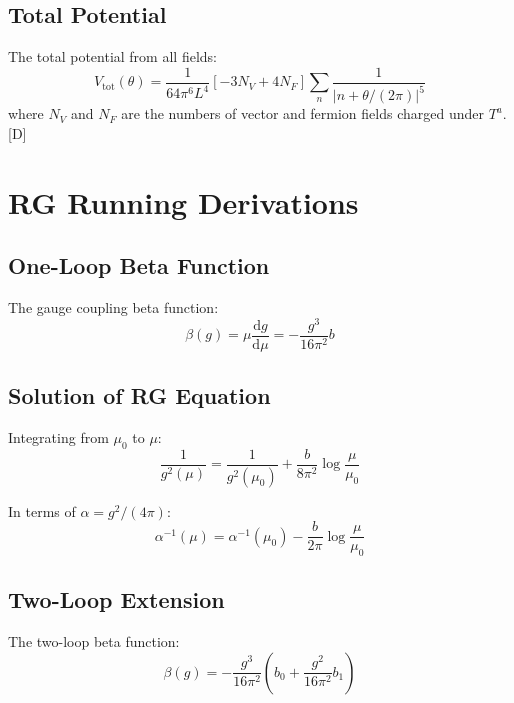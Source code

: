 \documentclass[11pt,a4paper]{article}
\newcommand{\dd}{\mathrm{d}}
\begin{document}
\subsection{Total Potential}

The total potential from all fields:
\begin{equation}
V_{\text{tot}}(\theta) = \frac{1}{64\pi^6 L^4}\left[-3 N_V + 4 N_F\right]\sum_n \frac{1}{|n + \theta/(2\pi)|^5}
\label{eq:total-potential}
\end{equation}
where $N_V$ and $N_F$ are the numbers of vector and fermion fields charged under $T^a$. [D]

\section{RG Running Derivations}
\label{app:rg-detail}

\subsection{One-Loop Beta Function}

The gauge coupling beta function:
\begin{equation}
\beta(g) = \mu\frac{\dd g}{\dd\mu} = -\frac{g^3}{16\pi^2}b
\label{eq:beta-def}
\end{equation}

\subsection{Solution of RG Equation}

Integrating from $\mu_0$ to $\mu$:
\begin{equation}
\frac{1}{g^2(\mu)} = \frac{1}{g^2(\mu_0)} + \frac{b}{8\pi^2}\log\frac{\mu}{\mu_0}
\label{eq:rg-solution}
\end{equation}

In terms of $\alpha = g^2/(4\pi)$:
\begin{equation}
\alpha^{-1}(\mu) = \alpha^{-1}(\mu_0) - \frac{b}{2\pi}\log\frac{\mu}{\mu_0}
\label{eq:alpha-running}
\end{equation}

\subsection{Two-Loop Extension}

The two-loop beta function:
\begin{equation}
\beta(g) = -\frac{g^3}{16\pi^2}\left(b_0 + \frac{g^2}{16\pi^2}b_1\right)
\label{eq:two-loop-beta}
\end{equation}
\end{document}
